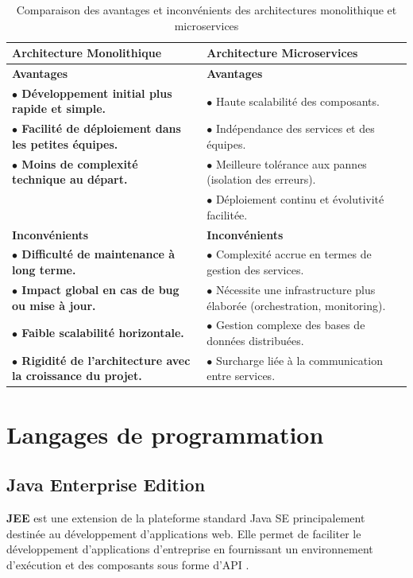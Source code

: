 \begin{table}[H]
\centering
{}
\renewcommand{\arraystretch}{1.5}
\begin{tabular}{|>{\bfseries}m{5.5cm}|m{8cm}|}
\hline
\rowcolor{blue!20}
\textbf{Architecture Monolithique} & \textbf{Architecture Microservices} \\
\hline
\textbf{Avantages} & \textbf{Avantages} \\
\hline
$\bullet$ Développement initial plus rapide et simple. & $\bullet$ Haute scalabilité des composants. \\
$\bullet$ Facilité de déploiement dans les petites équipes. & $\bullet$ Indépendance des services et des équipes. \\
$\bullet$ Moins de complexité technique au départ. & $\bullet$ Meilleure tolérance aux pannes (isolation des erreurs). \\
 & $\bullet$ Déploiement continu et évolutivité facilitée. \\
\hline
\textbf{Inconvénients} & \textbf{Inconvénients} \\
\hline
$\bullet$ Difficulté de maintenance à long terme. & $\bullet$ Complexité accrue en termes de gestion des services. \\
$\bullet$ Impact global en cas de bug ou mise à jour. & $\bullet$ Nécessite une infrastructure plus élaborée (orchestration, monitoring). \\
$\bullet$ Faible scalabilité horizontale. & $\bullet$ Gestion complexe des bases de données distribuées. \\
$\bullet$ Rigidité de l'architecture avec la croissance du projet. & $\bullet$ Surcharge liée à la communication entre services. \\
\hline
\end{tabular}
\caption{Comparaison des avantages et inconvénients des architectures monolithique et microservices \cite{martin-fowler-microservices}}
\label{tab:comparaison_architectures}
\end{table}

\section{Langages de programmation}
\subsection{Java Enterprise Edition}
\textbf{JEE} est une extension de la plateforme standard Java SE principalement destinée au développement d'applications web. Elle permet de faciliter le développement d'applications d'entreprise en fournissant un environnement d'exécution et des composants sous forme d'API \cite{Jee}.

